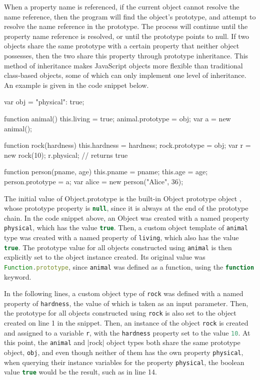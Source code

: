 \documentclass[a4paper,11pt,twoside]{report}
\def\jsinline{\lstinline[language=JavaScript, basicstyle=\small]}%\end{lstlisting}
\begin{document}
When a property name is referenced, if the current object cannot resolve the name reference, then the program will find the object's prototype, and attempt to resolve the name reference in the prototype. The process will continue until the property name reference is resolved, or until the prototype points to null. If two objects share the same prototype with a certain property that neither object possesses, then the two share this property through prototype inheritance. This method of inheritance makes JavaScript objects more flexible than traditional class-based objects, some of which can only implement one level of inheritance. An example is given in the code snippet below.

\quad
\begin{minipage}{0.395\textwidth}
\qquad
\begin{lstjs}
var obj = {"physical": true};

function animal() {
	this.living = true;
}
animal.prototype = obj;
var a = new animal();

function rock(hardness) {
	this.hardness = hardness;
}
rock.prototype = obj;
var r = new rock(10);
r.physical; // returns true

function person(pname, age) {
	this.pname = pname;
	this.age = age;
}
person.prototype = a;
var alice = new person("Alice", 36);

\end{lstjs}
\end{minipage}
\begin{minipage}{0.54\textwidth}
The initial value of Object.prototype is the built-in Object prototype object \cite{EcmaScript}, whose prototype property is \jsinline|null|, since it is always at the end of the prototype chain. In the code snippet above, an Object was created with a named property \jsinline|physical|, which has the value \jsinline|true|. Then, a custom object template of \jsinline|animal| type was created with a named property of \jsinline|living|, which also has the value \jsinline|true|. The prototype value for all objects constructed using \jsinline|animal| is then explicitly set to the object instance created. Its original value was \jsinline|Function.prototype|, since \jsinline|animal| was defined as a function, using the \jsinline|function| keyword. 
\end{minipage}

In the following lines, a custom object type of \jsinline|rock| was defined with a named property of \jsinline|hardness|, the value of which is taken as an input parameter. Then, the prototype for all objects constructed using \jsinline|rock| is also set to the object created on line 1 in the snippet. Then, an instance of the object \jsinline|rock| is created and assigned to a variable \jsinline|r|, with the \jsinline|hardness| property set to the value \jsinline|10|. At this point, the \jsinline|animal| and |rock| object types both share the same prototype object, \jsinline|obj|, and even though neither of them has the own property \jsinline|physical|, when querying their instance variables for the property \jsinline|physical|, the boolean value \jsinline|true| would be the result, such as in line 14. 
\end{document}
